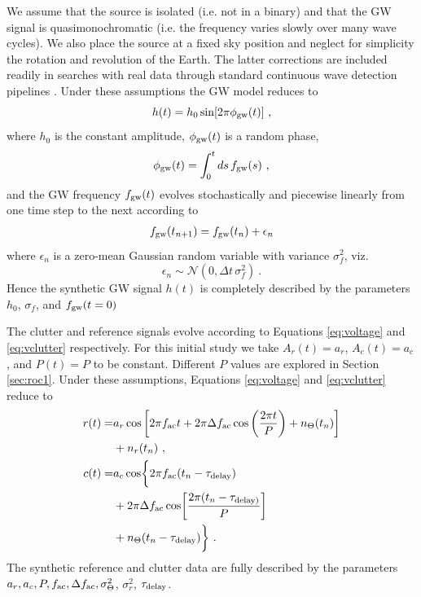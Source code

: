 \documentclass[pra,superscriptaddress,reprint,amsmath,amssymb,nofootinbib]{revtex4-2}
\begin{document}
We assume that the source is isolated (i.e. not in a binary) and that the GW signal is quasimonochromatic (i.e. the frequency varies slowly over many wave cycles). We also place the source at a fixed sky position and neglect for simplicity the rotation and revolution of the Earth. The latter corrections are included readily in searches with real data through standard continuous wave detection pipelines \cite{Suvorova2016PhRv,2022PhRvD.106j2008A}. Under these assumptions the GW model reduces to 
\begin{equation}
	h(t) = h_0\sin[2\pi \phi_{\rm gw}(t)] \ , \label{eq:ht}
\end{equation}
where $h_0$ is the constant amplitude, $\phi_{\rm gw}(t)$ is a random phase,
\begin{equation}
	\phi_{\rm gw}(t) = \int_{0}^{t} ds \, f_{\rm gw}(s)  \ ,
\end{equation}
and the GW frequency $f_{\rm gw}(t)$ evolves stochastically and piecewise linearly from one time step to the next according to
\begin{eqnarray}
	f_{\rm gw}(t_{n+1}) = f_{\rm gw}(t_n) + \epsilon_n 
\end{eqnarray}
where $\epsilon_n$ is a zero-mean Gaussian random variable with variance $\sigma_f^2$, viz.
\begin{equation}
	\epsilon_n \sim \mathcal{N}(0, \Delta t  \, \sigma_f^2) \ . \label{eq:gwfreqnoise}
\end{equation}
Hence the synthetic GW signal $h(t)$ is completely described by the parameters $h_0$, $\sigma_f$, and $f_{\rm gw}(t=0)$ \newline 

The clutter and reference signals evolve according to Equations \eqref{eq:voltage} and \eqref{eq:vclutter} respectively. For this initial study we take $A_r(t) = a_r$, $A_c(t) = a_c$, and $P(t) = P$ to be constant. Different $P$ values are explored in Section \ref{sec:roc1}. Under these assumptions, Equations \eqref{eq:voltage} and \eqref{eq:vclutter} reduce to 
\begin{align}
 	r(t) = & a_r \cos \left[ 2 \pi f_{\rm ac} t +2 \pi \Delta f_{\rm ac} \cos\left(\frac{2 \pi t}{P}\right) + n_{\Theta} (t_n) \right] \nonumber \\ 
 	&+n_r(t_n) \ , \\ 
	c(t) = & a_c \cos \biggl \{ 2 \pi f_{\rm ac} (t_n - \tau_{\rm delay}) \nonumber \\ 
	&+ 2 \pi \Delta f_{\rm ac} \cos \biggl [ \frac{2 \pi (t_n - \tau_{\rm delay)}}{P} \biggr ] \nonumber \\ 
	&+ n_{\Theta} (t_n - \tau_{\rm delay}) \biggr \} \ .
	\label{eq:clutterequation}
\end{align}
The synthetic reference and clutter data are fully described by the parameters $a_r,a_c,P, f_{\rm ac}, \Delta f_{\rm ac},\sigma^2_{\Theta}$, $\sigma_r^2$, $\tau_{\rm delay}$. \newline 
\end{document}
